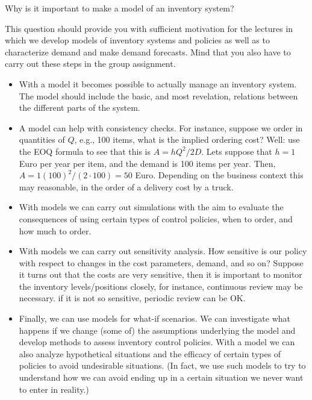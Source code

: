 \begin{question}
  Why is it important to make a model of an inventory system?

  This question should provide you with sufficient motivation for the
  lectures in which we develop models of inventory systems and policies as well as to characterize demand and make demand forecasts.  Mind that you also have to carry out these steps in the group
assignment.


\end{question}

  \begin{solution}
    \begin{itemize}
    \item With a model it becomes possible to actually manage an
      inventory system. The model should include the basic, and most
      revelation, relations between the different parts of the system.
    \item A model can help with consistency checks. For instance,
      suppose we order in quantities of $Q$, e.g., 100 items, what is
      the implied ordering cost?  Well: use the EOQ formula to see
      that this is $A=hQ^2/2D$.  Lets suppose that $h=1$ Euro per year
      per item, and the demand is 100 items per year. Then,
      $A=1(100)^2/(2\cdot 100) = 50$ Euro. Depending on the business
      context this may reasonable, in the order of a delivery cost by
      a truck.
    \item With models we can carry out simulations with the aim to
      evaluate the consequences of using certain types of control
      policies, when to order, and how much to order.
    \item With models we can carry out sensitivity analysis. How
      sensitive is our policy with respect to changes in the cost
      parameters, demand, and so on? Suppose it turns out that the
      costs are very sensitive, then it is important to monitor the
      inventory levels/positions closely, for instance, continuous
      review may be necessary. if it is not so sensitive, periodic
      review can be OK.
    \item Finally, we can use models for what-if scenarios.  We can
      investigate what happens if we change (some of) the assumptions
      underlying the model and develop methods to assess inventory
      control policies. With a model we can also analyze hypothetical
      situations and the efficacy of certain types of policies to
      avoid undesirable situations. (In fact, we use such models to
      try to understand how we can avoid ending up in a certain
      situation we never want to enter in reality.)
    \end{itemize}
  \end{solution}


